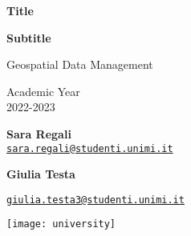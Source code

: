 \begin{titlepage}
   \begin{center}
       \vspace*{1cm}
	\Huge
       \textbf{Title}

       \vspace{0.5cm}
	\huge
       \textbf{Subtitle}

       \vspace{1cm}

	\LARGE
        Geospatial Data Management

       \vspace{1cm}
        Academic Year\\2022-2023
            
       \vspace{1.5cm}

       \textbf{Sara Regali}\\
       \vspace{0.3cm}
	\normalsize
	\href{sara.regali@studenti.unimi.it}{\nolinkurl{sara.regali@studenti.unimi.it}}\\

	\vspace{0.3cm}

	\LARGE
       \textbf{Giulia Testa}\\
       \vspace{0.3cm}
	\normalsize

	\href{giulia.testa3@studenti.unimi.it}{\nolinkurl{giulia.testa3@studenti.unimi.it}}
       \vfill
            
       \vspace{0.8cm}
     
       \texttt{[image: university]}
            
   \end{center}
\end{titlepage}